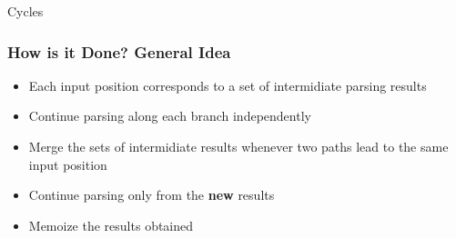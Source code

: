 \documentclass[xcolor=table]{beamer}
\begin{document}
\begin{frame}[fragile]
\begin{multicols}{2}
\columnbreak 

\pause

\begin{center} Cycles \end{center}
\begin{center}
\end{center}
\end{multicols}
\end{frame}

\begin{frame}[fragile]
  \transwipe[direction=90]
  \frametitle{How is it Done? General Idea}
\begin{itemize}
  \item Each input position corresponds to a set of intermidiate parsing results
  \item Continue parsing along each branch independently
  \item Merge the sets of intermidiate results whenever two paths lead to the same input position
  \item Continue parsing only from the \textbf{new} results
  \item Memoize the results obtained 
\end{itemize}
\end{frame}
\end{document}
